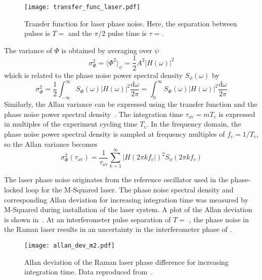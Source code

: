 \begin{figure}[htpb!]
  \centering
  \texttt{[image: transfer\_func\_laser.pdf]}
  \caption[Transfer function for laser phase noise.]{Transfer function
  for laser phase noise. Here, the separation between pulses is \(T =
  \) and the \(\pi/2\) pulse time is \(\tau
=\).}
  \label{fig:transfer_function}
\end{figure}
\par\noindent
The variance of \(\Phi\) is obtained by averaging over \(\psi\)
\begin{equation} 
  \sigma_\Phi^2 = \langle \Phi^2\rangle_\psi = \frac{1}{2} A^2
  |H(\omega)|^2
  \label{eq:var_phi_transfer}
\end{equation} which is related to the phase noise power spectral density
\(S_\phi(\omega)\) by
  \begin{equation}
    \sigma_\Phi^2 = \frac{1}{2}\int_{-\infty}^\infty
    S_\Phi(\omega)|H(\omega)|^2 \frac{\mathrm{d}\omega}{2\pi} =
      \int_0^\infty
    S_\Phi(\omega)|H(\omega)|^2 \frac{\mathrm{d}\omega}{2\pi} 
    \label{eq:phase_noise_psd}
  \end{equation}
Similarly, the Allan variance can be expressed using the transfer
function and the phase noise power spectral density~\cite{Gouet2008}.
The integration time \(\tau_\text{av} = m T_c\) is expressed in multiples
of the experiment cycling time \(T_c\). In the frequency domain, the phase
noise power spectral density is sampled at frequency multiples of
\(f_c = 1/T_c\), so the Allan variance becomes
\begin{equation}
  \sigma^2_\Phi(\tau_\text{av}) = \frac{1}{\tau_\text{av}}
    \sum_{k=1}^\infty |H(2\pi k f_c|)^2S_\phi(2\pi k f_c)
  \label{eq:avar_transfer}
\end{equation}
\par\noindent
The laser phase noise originates from the reference oscillator used in
the phase-locked loop for the M-Squared laser. The phase noise
spectral density and corresponding Allan deviation for increasing
integration time was measured by M-Squared during installation of the
laser system. A plot of the Allan deviation is shown
in~. At an interferometer pulse
separation of
\(T = \) , the phase noise in the Raman
laser results in an uncertainty in the interferometer phase of
. 
\begin{figure}[htpb!]
  \centering
  \texttt{[image: allan\_dev\_m2.pdf]}
  \caption[Allan deviation of the Raman laser phase difference.]{Allan deviation of the Raman laser phase difference for increasing integration time. Data reproduced from~\cite{M2_manual}.}
  \label{fig:allan_dev_m2}
\end{figure}


